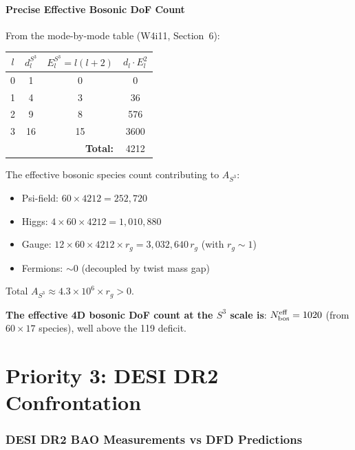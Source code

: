 \documentclass[11pt,a4paper]{article}
\begin{document}
\subsection{Precise Effective Bosonic DoF Count}

From the mode-by-mode table (W4i11, Section~6):

\begin{center}
\begin{tabular}{cccc}
\toprule
$l$ & $d_l^{S^3}$ & $E_l^{S^3} = l(l+2)$ & $d_l \cdot E_l^2$ \\
\midrule
0 & 1 & 0 & 0 \\
1 & 4 & 3 & 36 \\
2 & 9 & 8 & 576 \\
3 & 16 & 15 & 3600 \\
\midrule
\multicolumn{3}{r}{\textbf{Total:}} & 4212 \\
\bottomrule
\end{tabular}
\end{center}

The effective bosonic species count contributing to $A_{S^3}$:
\begin{itemize}[nosep]
\item Psi-field: $60 \times 4212 = 252{,}720$
\item Higgs: $4 \times 60 \times 4212 = 1{,}010{,}880$
\item Gauge: $12 \times 60 \times 4212 \times r_g = 3{,}032{,}640\,r_g$
  (with $r_g \sim 1$)
\item Fermions: $\sim 0$ (decoupled by twist mass gap)
\end{itemize}

Total $A_{S^3} \approx 4.3 \times 10^6 \times r_g > 0$.

\textbf{The effective 4D bosonic DoF count at the $S^3$ scale is}:
$N_{\rm bos}^{\rm eff} = 1020$ (from $60 \times 17$ species), well
above the 119 deficit.


\part{Priority 3: DESI DR2 Confrontation}
\label{part:DESI}


\section{DESI DR2 BAO Measurements vs DFD Predictions}
\label{sec:DESI}
\end{document}
